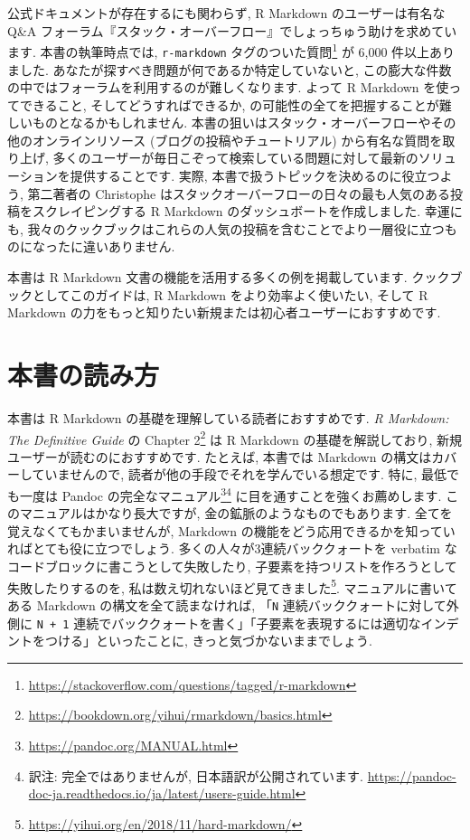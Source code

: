 \documentclass[
  11pt,
  lualatex,
  ja=standard]{bxjsreport}
\renewcommand{\href}[2]{#2\footnote{\url{#1}}}
\begin{document}
公式ドキュメントが存在するにも関わらず, R Markdown のユーザーは有名な Q\&A フォーラム『スタック・オーバーフロー』でしょっちゅう助けを求めています. 本書の執筆時点では, \href{https://stackoverflow.com/questions/tagged/r-markdown}{\texttt{r-markdown} タグのついた質問} が 6,000 件以上ありました. あなたが探すべき問題が何であるか特定していないと, この膨大な件数の中ではフォーラムを利用するのが難しくなります. よって R Markdown を使ってできること, そしてどうすればできるか, の可能性の全てを把握することが難しいものとなるかもしれません. 本書の狙いはスタック・オーバーフローやその他のオンラインリソース (ブログの投稿やチュートリアル) から有名な質問を取り上げ, 多くのユーザーが毎日こぞって検索している問題に対して最新のソリューションを提供することです. 実際, 本書で扱うトピックを決めるのに役立つよう, 第二著者の Christophe はスタックオーバーフローの日々の最も人気のある投稿をスクレイピングする R Markdown のダッシュボートを作成しました. 幸運にも, 我々のクックブックはこれらの人気の投稿を含むことでより一層役に立つものになったに違いありません.

本書は R Markdown 文書の機能を活用する多くの例を掲載しています. クックブックとしてこのガイドは, R Markdown をより効率よく使いたい, そして R Markdown の力をもっと知りたい新規または初心者ユーザーにおすすめです.

\hypertarget{How-to-read-this-book}{%
\section*{本書の読み方}\label{How-to-read-this-book}}

本書は R Markdown の基礎を理解している読者におすすめです. \emph{R Markdown: The Definitive Guide} \autocite{rmarkdown2018} の \href{https://bookdown.org/yihui/rmarkdown/basics.html}{Chapter 2} は R Markdown の基礎を解説しており, 新規ユーザーが読むのにおすすめです. たとえば, 本書では Markdown の構文はカバーしていませんので, 読者が他の手段でそれを学んでいる想定です. 特に, 最低でも一度は \href{https://pandoc.org/MANUAL.html}{Pandoc の完全なマニュアル}\footnote{訳注: 完全ではありませんが, 日本語訳が公開されています. \url{https://pandoc-doc-ja.readthedocs.io/ja/latest/users-guide.html}} に目を通すことを強くお薦めします. このマニュアルはかなり長大ですが, 金の鉱脈のようなものでもあります. 全てを覚えなくてもかまいませんが, Markdown の機能をどう応用できるかを知っていればとても役に立つでしょう. 多くの人々が3連続バッククォートを verbatim なコードブロックに書こうとして失敗したり, 子要素を持つリストを作ろうとして失敗したりするのを, \href{https://yihui.org/en/2018/11/hard-markdown/}{私は数え切れないほど見てきました}. マニュアルに書いてある Markdown の構文を全て読まなければ, 「\texttt{N} 連続バッククォートに対して外側に \texttt{N + 1} 連続でバッククォートを書く」「子要素を表現するには適切なインデントをつける」といったことに, きっと気づかないままでしょう.
\end{document}
